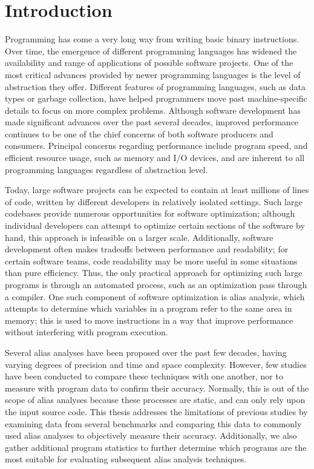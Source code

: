 \chapter{Introduction}

Programming has come a very long way from writing basic binary instructions. Over time, the emergence of different programming languages has widened the availability and range of applications of possible software projects. One of the most critical advances provided by newer programming languages is the level of abstraction they offer. Different features of programming languages, such as data types or garbage collection, have helped programmers move past machine-specific details to focus on more complex problems. Although software development has made significant advances over the past several decades, improved performance continues to be one of the chief concerns of both software producers and consumers. Principal concerns regarding performance include program speed, and efficient resource usage, such as memory and I/O devices, and are inherent to all programming languages regardless of abstraction level.

Today, large software projects can be expected to contain at least millions of lines of code\cite{google}, written by different developers in relatively isolated settings. Such large codebases provide numerous opportunities for software optimization; although individual developers can attempt to optimize certain sections of the software by hand, this approach is infeasible on a larger scale. Additionally, software development often makes tradeoffs between performance and readability; for certain software teams, code readability may be more useful in some situations than pure efficiency. Thus, the only practical approach for optimizing such large programs is through an automated process, such as an optimization pass through a compiler. One such component of software optimization is alias analysis, which attempts to determine which variables in a program refer to the same area in memory; this is used to move instructions in a way that improve performance without interfering with program execution.

Several alias analyses have been proposed over the past few decades, having varying degrees of precision and time and space complexity. However, few studies have been conducted to compare these techniques with one another, nor to measure with program data to confirm their accuracy. Normally, this is out of the scope of alias analyses because these processes are static, and can only rely upon the input source code. This thesis addresses the limitations of previous studies by examining data from several benchmarks and comparing this data to commonly used alias analyses to objectively measure their accuracy. Additionally, we also gather additional program statistics to further determine which programs are the most suitable for evaluating subsequent alias analysis techniques.
